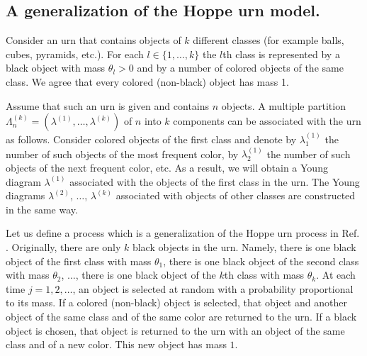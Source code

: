 \documentclass[12pt]{amsart}
\theoremstyle{definition}
\numberwithin{equation}{section}
\begin{document}
\subsection{A generalization of the Hoppe urn model.}\label{Section3.2}
Consider an urn that contains objects of $k$ different classes
(for example balls, cubes, pyramids, etc.). For each $l\in\{1,\ldots,k\}$
the $l$th class is represented by a black object with mass $\theta_l>0$ and
by a number of colored objects of the same class.
We agree that every colored (non-black) object has mass 1.

Assume that such an urn is given and contains $n$ objects.
A multiple partition $\Lambda_n^{(k)}=\left(\lambda^{(1)},\ldots,\lambda^{(k)}\right)$ of $n$
into $k$ components can be associated with the urn as follows.
Consider colored objects of the first class and denote
by $\lambda_1^{(1)}$ the number of such objects of the most frequent color, by $\lambda_2^{(1)}$ the number of such objects of the next frequent color, etc.
As a result, we will obtain a Young diagram $\lambda^{(1)}$ associated with the objects of the first class in the urn.
The Young diagrams $\lambda^{(2)}$, $\ldots$, $\lambda^{(k)}$
associated with objects of other classes are constructed in the same way.

Let us define a process which is a generalization
of the Hoppe urn process in Ref. \cite{Hoppe1}.
Originally, there are only $k$ black objects in the urn.
Namely, there is one black object of the first class
with mass $\theta_1$, there is one black object of the second class with mass $\theta_2$, $\ldots$,  there is one black object of the $k$th class with mass $\theta_k$.
At each time $j=1,2,\ldots$, an object is selected at random with a probability proportional to its mass. If a colored (non-black) object is selected, that object and another object of the same class and of the same color are returned to the urn. If a black object is chosen, that object is returned to the urn with an object of the same class and of a new color. This new object has mass $1$.
\end{document}
